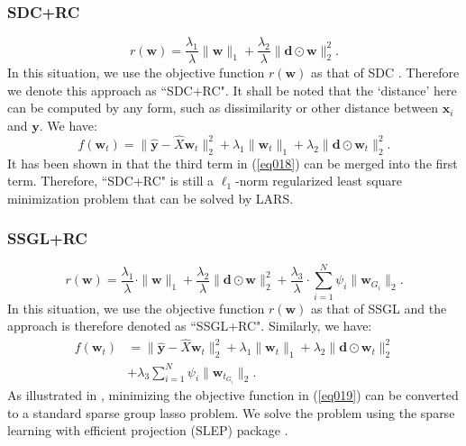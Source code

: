 \documentclass[journal]{IEEEtran}
\begin{document}
  \subsubsection{SDC+RC}

  \begin{equation}
 r(\textbf{w})=\frac{\lambda_1}{\lambda}\|\textbf{w}\|_1+\frac{\lambda_2}{\lambda}\| \textbf{d}\odot \textbf{w}\|_2^2.
  \end{equation}
  In this situation, we use the objective function $r(\textbf{w})$ as that of 	SDC \cite{CJ15}. Therefore we denote this approach as ``SDC+RC".
   It shall be noted that the   `distance' here can be computed by any form, such as dissimilarity or other distance between  $\textbf{x}_i$  and $\textbf{y}$.  We have:
   \begin{equation} f(\textbf{w}_t)=\|\hat{\textbf{y}}-\hat{X}\textbf{w}_t\|^2_2+ \lambda_1 \|\textbf{w}_t\|_1+ \lambda_2\| \textbf{d}\odot \textbf{w}_t\|_2^2. \label{eq018}
  \end{equation}
    It has been shown in  \cite{CJ15} that the third term in (\ref{eq018}) can be merged into the first term. Therefore,  ``SDC+RC"  is still a $\ell_1$-norm regularized least square minimization problem that can be solved by LARS.

%
  \subsubsection{SSGL+RC}
 \begin{equation} r(\textbf{w})=\frac{\lambda_1}{\lambda} \cdot
  \|\textbf{w}\|_1+\frac{\lambda_2}{\lambda}\|\textbf{d} \odot \textbf{w} \|_2^2+ \frac{\lambda_3}{\lambda} \cdot  \sum_{i=1}^N\psi_i\|\textbf{w}_{G_i}\|_2.
  \end{equation}
   In this situation, we use the objective function $r(\textbf{w})$ as that of SSGL \cite{Cheng:17BOE} and the approach is therefore denoted as ``SSGL+RC".
  Similarly, we have:
   \begin{align} f(\textbf{w}_t)&=\|\hat{\textbf{y}}-\hat{X}\textbf{w}_t\|^2_2+ \lambda_1 \|\textbf{w}_t\|_1+ \lambda_2\| \textbf{d}\odot \textbf{w}_t\|_2^2 \nonumber
   \\ &+\lambda_3   \sum_{i=1}^N\psi_i\|\textbf{w}_{t_{G_i}}\|_2.  \label{eq019}
  \end{align}
  As illustrated in \cite{Cheng:17BOE}, minimizing the objective function in (\ref{eq019}) can be converted to a standard sparse group lasso problem. We solve the
  problem using the sparse learning with efficient projection (SLEP) package \cite{Liu:2009:SLEP:manual}.
\end{document}
